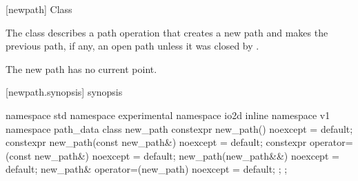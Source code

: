  [newpath] {Class }

\pnum
{}
The class  describes a path operation that creates a new path and makes the previous path, if any, an open path unless it was closed by .

\pnum
The new path has no current point.

 [newpath.synopsis] { synopsis}

\begin{codeblock}
namespace std { namespace experimental { namespace io2d { inline namespace v1 {
  namespace path_data {
    class new_path {
      constexpr new_path() noexcept = default;
      constexpr new_path(const new_path&) noexcept = default;
      constexpr operator=(const new_path&) noexcept = default;
      new_path(new_path&&) noexcept = default;
      new_path& operator=(new_path) noexcept = default;
    };
  };
} } } }
\end{codeblock}
